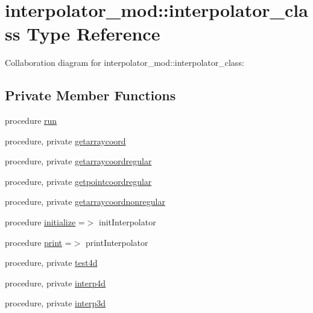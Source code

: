 \hypertarget{structinterpolator__mod_1_1interpolator__class}{}\section{interpolator\+\_\+mod\+:\+:interpolator\+\_\+class Type Reference}
\label{structinterpolator__mod_1_1interpolator__class}


Collaboration diagram for interpolator\+\_\+mod\+:\+:interpolator\+\_\+class\+:
\subsection*{Private Member Functions}
\begin{DoxyCompactItemize}
\item 
procedure \mbox{\hyperlink{structinterpolator__mod_1_1interpolator__class_a1080aca342174069db9c5639853d5dc0}{run}}
\item 
procedure, private \mbox{\hyperlink{structinterpolator__mod_1_1interpolator__class_a63c210046b0aaacf729778f802335e3b}{getarraycoord}}
\item 
procedure, private \mbox{\hyperlink{structinterpolator__mod_1_1interpolator__class_a6149cbafca4f69609a43694e66c1e8f4}{getarraycoordregular}}
\item 
procedure, private \mbox{\hyperlink{structinterpolator__mod_1_1interpolator__class_a66fdc4b04c2bf6cb1304d379934e3830}{getpointcoordregular}}
\item 
procedure, private \mbox{\hyperlink{structinterpolator__mod_1_1interpolator__class_acd8ed0dfedb43607ec182191ea953556}{getarraycoordnonregular}}
\item 
procedure \mbox{\hyperlink{structinterpolator__mod_1_1interpolator__class_a6911f5a4e2cbe3fcd8fbfce906429436}{initialize}} =$>$ init\+Interpolator
\item 
procedure \mbox{\hyperlink{structinterpolator__mod_1_1interpolator__class_a4b3112a37f09901a223d8cc3d81be4dd}{print}} =$>$ print\+Interpolator
\item 
procedure, private \mbox{\hyperlink{structinterpolator__mod_1_1interpolator__class_a2132c8be561d2afa1c369b9471a81e38}{test4d}}
\item 
procedure, private \mbox{\hyperlink{structinterpolator__mod_1_1interpolator__class_a150485e59a4b0edc41e730c116a37073}{interp4d}}
\item 
procedure, private \mbox{\hyperlink{structinterpolator__mod_1_1interpolator__class_a64a829fe34f0cf8a22f5b56718d7c51c}{interp3d}}
\end{DoxyCompactItemize}
